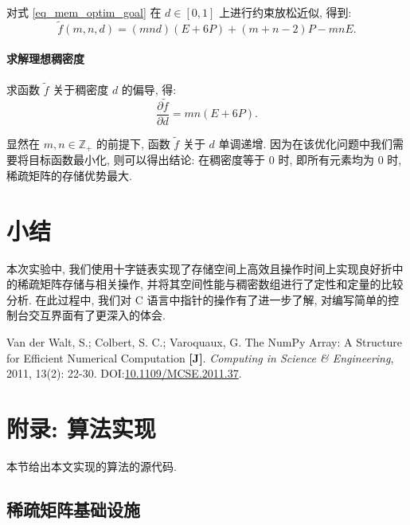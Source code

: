 对式 \ref{eq_mem_optim_goal} 在 $d \in [0, 1]$ 上进行约束放松近似, 得到:
\begin{equation}
    \tilde{f}(m, n, d) = (mnd)(E + 6P) + (m + n - 2)P - mnE.
    \label{eq_mem_optim_goal_relaxed}
\end{equation}

\paragraph{求解理想稠密度} 求函数 $\tilde{f}$ 关于稠密度 $d$ 的偏导, 得:
\begin{equation}
    \frac{\partial \tilde{f}}{\partial d} = mn(E + 6P).
\end{equation}

显然在 $m, n \in \mathbb{Z}_+$ 的前提下, 函数 $\tilde{f}$ 关于 $d$ 单调递增. 因为在该优化问题中我们需要将目标函数最小化, 则可以得出结论: 在稠密度等于 0 时, 即所有元素均为 0 时, 稀疏矩阵的存储优势最大.

\section{小结}

本次实验中, 我们使用十字链表实现了存储空间上高效且操作时间上实现良好折中的稀疏矩阵存储与相关操作, 并将其空间性能与稠密数组进行了定性和定量的比较分析. 在此过程中, 我们对 C 语言中指针的操作有了进一步了解, 对编写简单的控制台交互界面有了更深入的体会. 

\begin{thebibliography}{}

 Van der Walt, S.; Colbert, S. C.; Varoquaux, G. The NumPy Array: A Structure for Efficient Numerical Computation \textbf{[J]}. \textit{Computing in Science \& Engineering}, 2011, 13(2): 22-30. DOI:\href{https://doi.org/10.1109/MCSE.2011.37}{10.1109/MCSE.2011.37}.

\end{thebibliography}

\newpage

\appendix

\section{附录: 算法实现}

本节给出本文实现的算法的源代码.

\subsection{稀疏矩阵基础设施}

